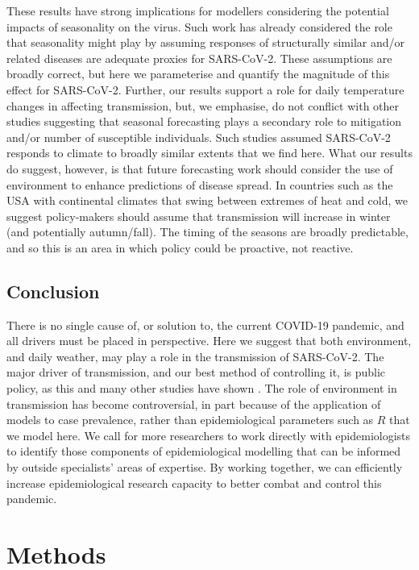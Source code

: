 \documentclass[12pt,english,a4paper]{article}
\newcommand{\virus}{SARS-CoV-2\xspace}
\newcommand{\disease}{COVID-19\xspace}
\begin{document}
These results have strong implications for modellers considering the potential impacts of seasonality on the virus. Such work has already considered the role that seasonality might play by assuming responses of structurally similar and/or related diseases are adequate proxies for \virus \cite{Baker2020}. These assumptions are broadly correct, but here we parameterise and quantify the magnitude of this effect for \virus. Further, our results support a role for daily temperature changes in affecting transmission, but, we emphasise, do not conflict with other studies suggesting that seasonal forecasting plays a secondary role to mitigation and/or number of susceptible individuals. Such studies \cite{Baker2020} assumed \virus responds to climate to broadly similar extents that we find here.
What our results do suggest, however, is that future forecasting work should consider the use of environment to enhance predictions of disease spread. In countries such as the USA with continental climates that swing between extremes of heat and cold, we suggest policy-makers should assume that transmission will increase in winter (and potentially autumn/fall). The timing of the seasons are broadly predictable, and so this is an area in which policy could be proactive, not reactive.


\subsection*{Conclusion} 
There is no single cause of, or solution to, the current \disease pandemic, and all drivers must be placed in perspective. Here we suggest that both environment, and daily weather, may play a role in the transmission of \virus. The major driver of transmission, and our best method of controlling it, is public policy, as this and many other studies have shown \citep{Jarvis2020, Lau2020}. 
The role of environment in transmission has become controversial, in part because of the application of models to case prevalence, rather than epidemiological parameters such as $R$
that we model here. We call for more researchers to work directly with epidemiologists 
to identify those components of epidemiological modelling that can be informed by outside specialists' areas of expertise. By working together, we can efficiently increase epidemiological research capacity to better combat and control this pandemic.


\clearpage
\section*{Methods}
\end{document}
